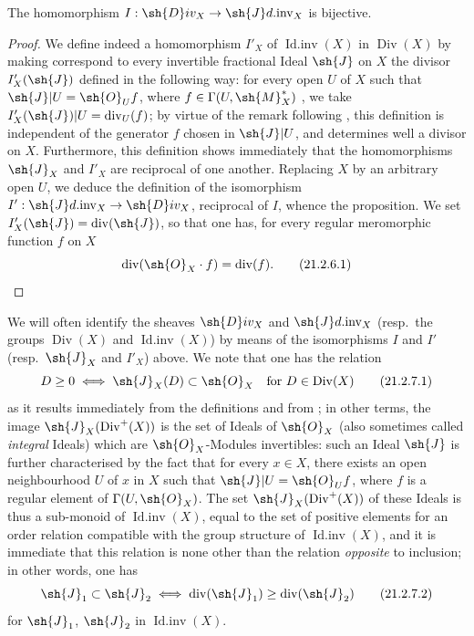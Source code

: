 \begin{proposition}[21.2.6]
\label{IV.21.2.6}
The homomorphism $I:\sh{D}iv_X\to\sh{J}d.\!\operatorname{inv}_X$ is bijective.
\end{proposition}

\begin{proof}
We define indeed a homomorphism $I'_X$ of $\operatorname{Id.inv}(X)$ in $\operatorname{Div}(X)$ by making correspond to every invertible fractional Ideal $\sh{J}$ on $X$ the divisor $I'_X(\sh{J})$ defined in the following way: for every open $U$ of $X$ such that $\sh{J}|U=\sh{O}_U f$, where $f\in\Gamma(U,\sh{M}_X^*)$ , we take $I'_X(\sh{J})|U=\operatorname{div}_U(f)$;
by virtue of the remark following , this definition is independent of the generator $f$ chosen in $\sh{J}|U$, and determines well a divisor on $X$.
Furthermore, this definition shows immediately that the homomorphisms $\sh{J}_X$ and $I'_X$ are reciprocal of one another.
Replacing $X$ by an arbitrary open $U$, we deduce the definition of the isomorphism $I':\sh{J}d.\!\operatorname{inv}_X\to\sh{D}iv_X$, reciprocal of $I$, whence the proposition.
We set $I'_X(\sh{J})=\operatorname{div}(\sh{J})$, so that one has, for every regular meromorphic function $f$ on $X$
\[
\label{IV.21.2.6.1}
  \operatorname{div}(\sh{O}_X\cdot f)=\operatorname{div}(f).
  \tag{21.2.6.1}
\]
\end{proof}

\begin{env}[21.2.7]
\label{IV.21.2.7}
We will often identify the sheaves $\sh{D}iv_X$ and $\sh{J}d.\!\operatorname{inv}_X$ (resp.\ the groups $\operatorname{Div}(X)$ and $\operatorname{Id.inv}(X)$) by means of the isomorphisms $I$ and $I'$ (resp.\ $\sh{J}_X$ and $I'_X$) above.
We note that one has the relation
\[
\label{IV.21.2.7.1}
  D\geq 0\iff\sh{J}_X(D)\subset\sh{O}_X\quad\text{for }D\in\operatorname{Div}(X)
  \tag{21.2.7.1}
\]
as it results immediately from the definitions  and from ;
in other terms, the image $\sh{J}_X(\operatorname{Div}^+(X))$ is the set of Ideals of $\sh{O}_X$ (also sometimes called \emph{integral} Ideals) which are $\sh{O}_X$-Modules invertibles: such an Ideal $\sh{J}$ is further characterised by the fact that for every $x\in X$, there exists an open neighbourhood $U$ of $x$ in $X$ such that $\sh{J}|U=\sh{O}_U f$, where $f$ is a regular element of $\Gamma(U,\sh{O}_X)$.
The set $\sh{J}_X(\operatorname{Div}^+(X))$ of these Ideals is thus a sub-monoid of $\operatorname{Id.inv}(X)$, equal to the set of positive elements for an order relation compatible with the group structure of $\operatorname{Id.inv}(X)$, and it is immediate that this relation is none other than the relation \emph{opposite} to inclusion;
in other words, one has
\[
\label{IV.21.2.7.2}
  \sh{J}_1\subset\sh{J}_2\iff\operatorname{div}(\sh{J}_1)\geq\operatorname{div}(\sh{J}_2)
  \tag{21.2.7.2}
\]
for $\sh{J}_1$, $\sh{J}_2$ in $\operatorname{Id.inv}(X)$.
\end{env}

